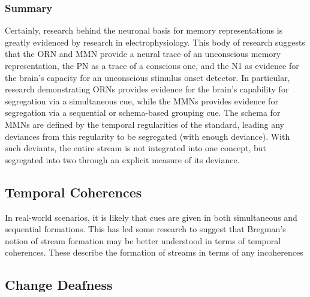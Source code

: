 \subsubsection{Summary}

Certainly, research behind the neuronal basis for memory representations is greatly evidenced by research in electrophysiology.  This body of research suggests that the ORN and MMN provide a neural trace of an unconscious memory representation, the PN as a trace of a conscious one, and the N1 as evidence for the brain's capacity for an unconscious stimulus onset detector.  In particular, research demonstrating ORNs provides evidence for the brain's capability for segregation via a simultaneous cue, while the MMNs provides evidence for segregation via a sequential or schema-based grouping cue.  The schema for MMNs are defined by the temporal regularities of the standard, leading any deviances from this regularity to be segregated (with enough deviance).  With such deviants, the entire stream is not integrated into one concept, but segregated into two through an explicit measure of its deviance.

\subsection{Temporal Coherences}

In real-world scenarios, it is likely that cues are given in both simultaneous and sequential formations.  This has led some research to suggest that Bregman's notion of stream formation may be better understood in terms of temporal coherences.  These describe the formation of streams in terms of any incoherences



\subsection{Change Deafness}


